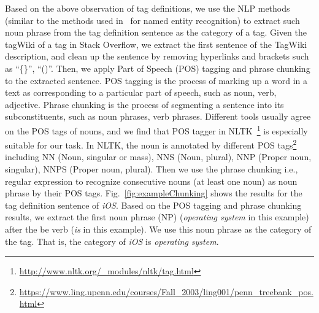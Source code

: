Based on the above observation of tag definitions, we use the NLP methods (similar to the methods used in~\cite{kazama2007exploiting} for named entity recognition) to extract such noun phrase from the tag definition sentence as the category of a tag.
Given the tagWiki of a tag in Stack Overflow, we extract the first sentence of the TagWiki description, and clean up the sentence by removing hyperlinks and brackets such as ``\{\}'', ``()''.
Then, we apply Part of Speech (POS) tagging and phrase chunking to the extracted sentence.
POS tagging is the process of marking up a word in a text as corresponding to a particular part of speech, such as noun, verb, adjective.
Phrase chunking is the process of segmenting a sentence into its subconstituents, such as noun phrases, verb phrases.
Different tools usually agree on the POS tags of nouns, and we find that POS tagger in NLTK~\cite{bird2006nltk}\footnote{\url{http://www.nltk.org/_modules/nltk/tag.html}} is especially suitable for our task.
In NLTK, the noun is annotated by different POS tags\footnote{\url{https://www.ling.upenn.edu/courses/Fall_2003/ling001/penn_treebank_pos.html}} including NN (Noun, singular or mass), NNS (Noun, plural), NNP (Proper noun, singular), NNPS (Proper noun, plural).
Then we use the phrase chunking i.e., regular expression to recognize consecutive nouns (at least one noun) as noun phrase by their POS tags.
Fig.~\ref{fig:exampleChunking} shows the results for the tag definition sentence of \textit{iOS}.
Based on the POS tagging and phrase chunking results, we extract the first noun phrase (NP) (\textit{operating system} in this example) after the be verb (\textit{is} in this example).
We use this noun phrase as the category of the tag.
That is, the category of \textit{iOS} is \textit{operating system}.

